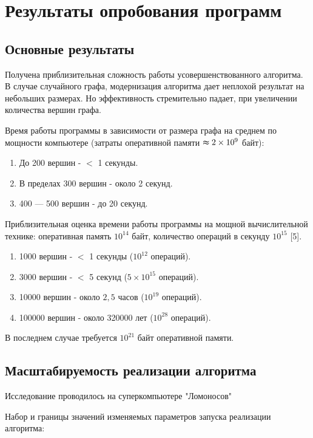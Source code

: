 \section{Результаты опробования программ}
\label{sec:Results_8} 
\large 

\subsection{Основные результаты}
Получена приблизительная сложность работы усовершенствованного алгоритма. В случае случайного графа, модернизация алгоритма дает неплохой результат на небольших размерах. Но эффективность стремительно падает, при увеличении количества вершин графа.

Время работы программы в зависимости от размера графа на среднем по мощности компьютере (затраты оперативной памяти $\thickapprox 2\times 10^9$ байт):
\begin{enumerate}
\item  До 200 вершин - $<$ 1 секунды.
\item  В пределах 300 вершин - около 2 секунд.
\item  400 — 500 вершин - до 20 секунд.
\end{enumerate}




Приблизительная оценка времени работы программы на мощной вычислительной технике:
оперативная память $10^{14}$ байт,
количество операций в секунду $10^{15}$ [5].
\begin{enumerate}
\item 1000 вершин - $<$ 1 секунды  ($10^{12}$  операций).
\item 3000 вершин - $<$ 5 секунд ($5\times 10^{15}$ операций).
\item 10000 вершин - около $2,5$ часов ($10^{19}$ операций).
\item 100000 вершин - около 320000 лет ($10 ^{28}$ операций).
\end{enumerate}
В последнем случае требуется $10^{21}$ байт оперативной памяти.


\subsection{Масштабируемость реализации алгоритма}
Исследование проводилось на суперкомпьютере "Ломоносов" \cite{Voevodin_article_1}

Набор и границы значений изменяемых параметров запуска реализации алгоритма: 

